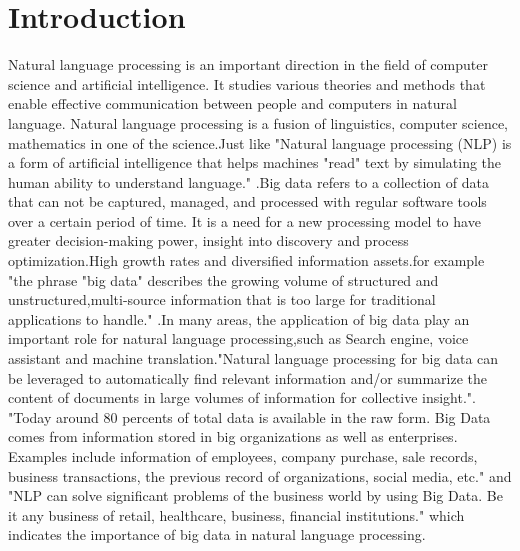 \documentclass[sigconf]{acmart}
\begin{document}
\section{Introduction}
Natural language processing is an important direction in the field of computer science and artificial intelligence. It studies various theories and methods that enable effective communication between people and computers in natural language. Natural language processing is a fusion of linguistics, computer science, mathematics in one of the science.Just like "Natural language processing (NLP) is a form of artificial intelligence that helps machines "read" text by simulating the human ability to understand language."\cite{Scagliarini2017} .Big data refers to a collection of data that can not be captured, managed, and processed with regular software tools over a certain period of time. It is a need for a new processing model to have greater decision-making power, insight into discovery and process optimization.High growth rates and diversified information assets.for example "the phrase "big data" describes the growing volume of structured and unstructured,multi-source information that is too large for traditional applications to handle."\cite{Scagliarini2017} .In many areas, the application of big data play an important role for natural language processing,such as Search engine, voice assistant and machine translation."Natural language processing for big data can be leveraged to automatically find relevant information and/or summarize the content of documents in large volumes of information for collective insight."\cite{Scagliarini2017}. "Today around 80 percents of total data is available in the raw form. Big Data comes from information stored in big organizations as well as enterprises. Examples include information of employees, company purchase, sale records, business transactions, the previous record of organizations, social media, etc."\cite{Jagreet2017} and "NLP can solve significant problems of the business world by using Big Data. Be it any business of retail, healthcare, business, financial institutions."\cite{Jagreet2017} which indicates the importance of big data in natural language processing.
\end{document}
